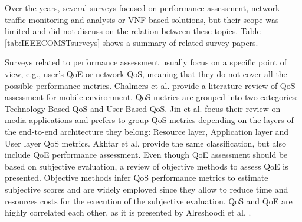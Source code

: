 Over the years, several surveys focused on performance assessment, network traffic monitoring and analysis or VNF-based solutions, but their scope was limited and did not discuss on the relation between these topics. Table \ref{tab:IEEECOMSTsurveys} shows a summary of related survey papers.

Surveys related to performance assessment usually focus on a specific point of view, e.g., user's QoE or network QoS, meaning that they do not cover all the possible performance metrics. Chalmers et al. \cite{Chalmers1999} provide a literature review of QoS assessment for mobile environment. QoS metrics are grouped into two categories: Technology-Based QoS and User-Based QoS. Jin et al. \cite{Jin2004} focus their review on media applications and prefers to group QoS metrics depending on the layers of the end-to-end architecture they belong: Resource layer, Application layer and User layer QoS metrics.
Akhtar et al. \cite{Akhtar2017} provide the same classification, but also include QoE performance assessment. Even though QoE assessment should be based on subjective evaluation, a review of objective methods to assess QoE is presented. Objective methods infer QoS performance metrics to estimate subjective scores and are widely employed since they allow to reduce time and resources costs for the execution of the subjective evaluation. QoS and QoE are highly correlated each other, as it is presented by Alreshoodi et al. \cite{Alreshoodi2013}.

